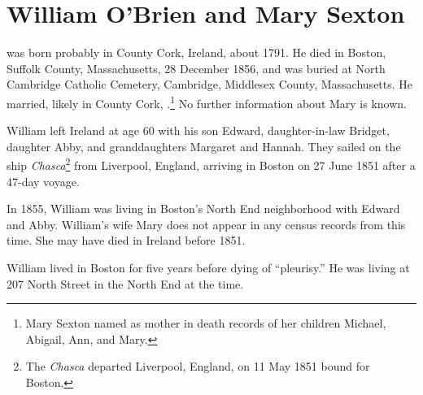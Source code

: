 \section{William O'Brien and Mary Sexton}\label{per:William1OBrien}

 was born probably in County Cork, Ireland, about 1791.\cite{Census1855William:2} He died in Boston, Suffolk County, Massachusetts, 28 December 1856,\cite{William1OBrienDeath:1} and was buried at North Cambridge Catholic Cemetery, Cambridge, Middlesex County, Massachusetts.\cite{DianaBerberenaLetter1:1} He married, likely in County Cork, .\footnote{Mary Sexton named as mother in death records of her children Michael, Abigail, Ann, and Mary.} No further information about Mary is known.

William left Ireland at age 60 with his son Edward, daughter-in-law Bridget, daughter Abby, and granddaughters Margaret and Hannah. They sailed on the ship \textit{Chasca}\footnote{The \textit{Chasca} departed Liverpool, England, on 11 May 1851 bound for Boston.} from Liverpool, England, arriving in Boston on 27 June 1851 after a 47-day voyage.\cite{Chascay:5}

In 1855, William was living in Boston's North End neighborhood with Edward and Abby.\cite{Census1855William:3} William's wife Mary does not appear in any census records from this time. She may have died in Ireland before 1851.

William lived in Boston for five years before dying of ``pleurisy.'' He was living at 207 North Street in the North End at the time.\cite{William1OBrienDeath:2}


